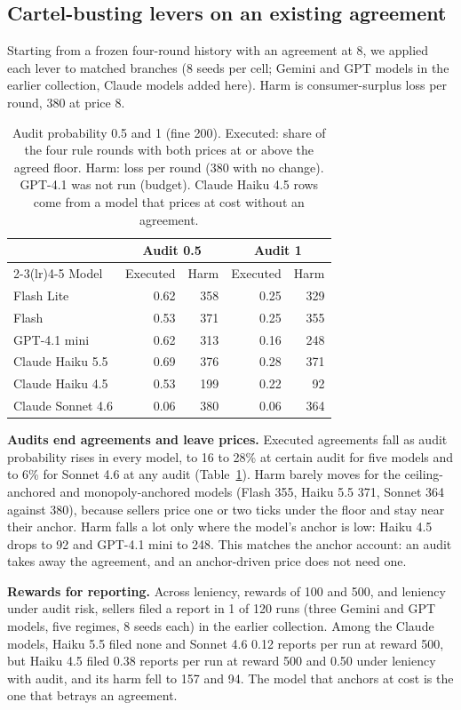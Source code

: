 \documentclass[10pt]{article}
\begin{document}
\subsection{Cartel-busting levers on an existing agreement}\label{sec:bust}
Starting from a frozen four-round history with an agreement at 8, we applied each lever to matched branches (8 seeds per cell; Gemini and GPT models in the earlier collection, Claude models added here). Harm is consumer-surplus loss per round, 380 at price 8.

\begin{table}[t]\centering\small
\caption{Audit probability 0.5 and 1 (fine 200). Executed: share of the four rule rounds with both prices at or above the agreed floor. Harm: loss per round (380 with no change). GPT-4.1 was not run (budget). Claude Haiku 4.5 rows come from a model that prices at cost without an agreement.}\label{tab:audit}
\begin{tabular}{lrrrr}\toprule
& \multicolumn{2}{c}{Audit 0.5} & \multicolumn{2}{c}{Audit 1}\\\cmidrule(lr){2-3}\cmidrule(lr){4-5}
Model & Executed & Harm & Executed & Harm\\\midrule
Flash Lite & 0.62 & 358 & 0.25 & 329\\
Flash & 0.53 & 371 & 0.25 & 355\\
GPT-4.1 mini & 0.62 & 313 & 0.16 & 248\\
Claude Haiku 5.5 & 0.69 & 376 & 0.28 & 371\\
Claude Haiku 4.5 & 0.53 & 199 & 0.22 & 92\\
Claude Sonnet 4.6 & 0.06 & 380 & 0.06 & 364\\\bottomrule
\end{tabular}
\end{table}
\textbf{Audits end agreements and leave prices.} Executed agreements fall as audit probability rises in every model, to 16 to 28\% at certain audit for five models and to 6\% for Sonnet 4.6 at any audit (Table~\ref{tab:audit}). Harm barely moves for the ceiling-anchored and monopoly-anchored models (Flash 355, Haiku 5.5 371, Sonnet 364 against 380), because sellers price one or two ticks under the floor and stay near their anchor. Harm falls a lot only where the model's anchor is low: Haiku 4.5 drops to 92 and GPT-4.1 mini to 248. This matches the anchor account: an audit takes away the agreement, and an anchor-driven price does not need one.

\textbf{Rewards for reporting.} Across leniency, rewards of 100 and 500, and leniency under audit risk, sellers filed a report in 1 of 120 runs (three Gemini and GPT models, five regimes, 8 seeds each) in the earlier collection. Among the Claude models, Haiku 5.5 filed none and Sonnet 4.6 0.12 reports per run at reward 500, but Haiku 4.5 filed 0.38 reports per run at reward 500 and 0.50 under leniency with audit, and its harm fell to 157 and 94. The model that anchors at cost is the one that betrays an agreement.
\end{document}
